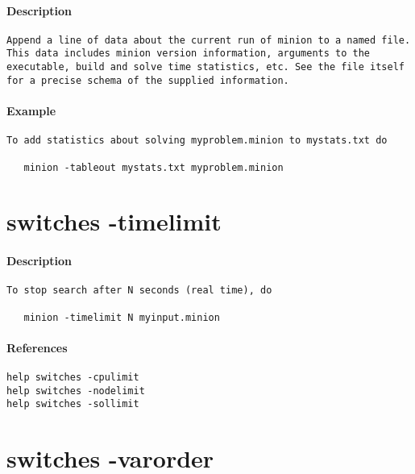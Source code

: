 \paragraph{Description}
{\footnotesize
\begin{verbatim}
Append a line of data about the current run of minion to a named file.
This data includes minion version information, arguments to the
executable, build and solve time statistics, etc. See the file itself
for a precise schema of the supplied information.
\end{verbatim}
}
\paragraph{Example}
{\footnotesize
\begin{verbatim}
To add statistics about solving myproblem.minion to mystats.txt do

   minion -tableout mystats.txt myproblem.minion
\end{verbatim}
}
\section{switches -timelimit}
\paragraph{Description}
{\footnotesize
\begin{verbatim}
To stop search after N seconds (real time), do

   minion -timelimit N myinput.minion
\end{verbatim}
}
\paragraph{References}
{\footnotesize
\begin{verbatim}
help switches -cpulimit
help switches -nodelimit
help switches -sollimit
\end{verbatim}
}
\section{switches -varorder}
